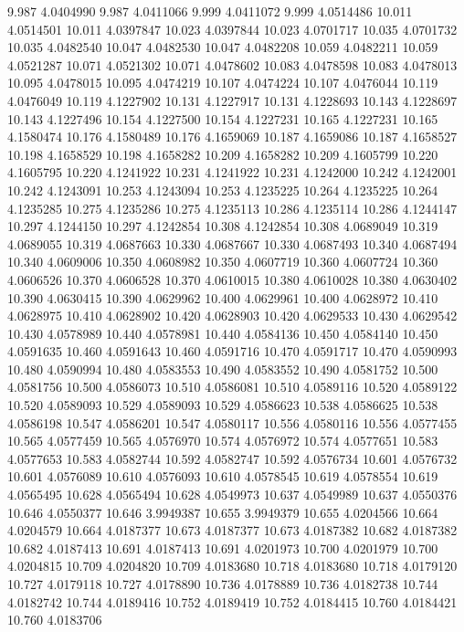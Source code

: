 9.987 4.0404990
9.987 4.0411066
9.999 4.0411072
9.999 4.0514486
10.011 4.0514501
10.011 4.0397847
10.023 4.0397844
10.023 4.0701717
10.035 4.0701732
10.035 4.0482540
10.047 4.0482530
10.047 4.0482208
10.059 4.0482211
10.059 4.0521287
10.071 4.0521302
10.071 4.0478602
10.083 4.0478598
10.083 4.0478013
10.095 4.0478015
10.095 4.0474219
10.107 4.0474224
10.107 4.0476044
10.119 4.0476049
10.119 4.1227902
10.131 4.1227917
10.131 4.1228693
10.143 4.1228697
10.143 4.1227496
10.154 4.1227500
10.154 4.1227231
10.165 4.1227231
10.165 4.1580474
10.176 4.1580489
10.176 4.1659069
10.187 4.1659086
10.187 4.1658527
10.198 4.1658529
10.198 4.1658282
10.209 4.1658282
10.209 4.1605799
10.220 4.1605795
10.220 4.1241922
10.231 4.1241922
10.231 4.1242000
10.242 4.1242001
10.242 4.1243091
10.253 4.1243094
10.253 4.1235225
10.264 4.1235225
10.264 4.1235285
10.275 4.1235286
10.275 4.1235113
10.286 4.1235114
10.286 4.1244147
10.297 4.1244150
10.297 4.1242854
10.308 4.1242854
10.308 4.0689049
10.319 4.0689055
10.319 4.0687663
10.330 4.0687667
10.330 4.0687493
10.340 4.0687494
10.340 4.0609006
10.350 4.0608982
10.350 4.0607719
10.360 4.0607724
10.360 4.0606526
10.370 4.0606528
10.370 4.0610015
10.380 4.0610028
10.380 4.0630402
10.390 4.0630415
10.390 4.0629962
10.400 4.0629961
10.400 4.0628972
10.410 4.0628975
10.410 4.0628902
10.420 4.0628903
10.420 4.0629533
10.430 4.0629542
10.430 4.0578989
10.440 4.0578981
10.440 4.0584136
10.450 4.0584140
10.450 4.0591635
10.460 4.0591643
10.460 4.0591716
10.470 4.0591717
10.470 4.0590993
10.480 4.0590994
10.480 4.0583553
10.490 4.0583552
10.490 4.0581752
10.500 4.0581756
10.500 4.0586073
10.510 4.0586081
10.510 4.0589116
10.520 4.0589122
10.520 4.0589093
10.529 4.0589093
10.529 4.0586623
10.538 4.0586625
10.538 4.0586198
10.547 4.0586201
10.547 4.0580117
10.556 4.0580116
10.556 4.0577455
10.565 4.0577459
10.565 4.0576970
10.574 4.0576972
10.574 4.0577651
10.583 4.0577653
10.583 4.0582744
10.592 4.0582747
10.592 4.0576734
10.601 4.0576732
10.601 4.0576089
10.610 4.0576093
10.610 4.0578545
10.619 4.0578554
10.619 4.0565495
10.628 4.0565494
10.628 4.0549973
10.637 4.0549989
10.637 4.0550376
10.646 4.0550377
10.646 3.9949387
10.655 3.9949379
10.655 4.0204566
10.664 4.0204579
10.664 4.0187377
10.673 4.0187377
10.673 4.0187382
10.682 4.0187382
10.682 4.0187413
10.691 4.0187413
10.691 4.0201973
10.700 4.0201979
10.700 4.0204815
10.709 4.0204820
10.709 4.0183680
10.718 4.0183680
10.718 4.0179120
10.727 4.0179118
10.727 4.0178890
10.736 4.0178889
10.736 4.0182738
10.744 4.0182742
10.744 4.0189416
10.752 4.0189419
10.752 4.0184415
10.760 4.0184421
10.760 4.0183706
